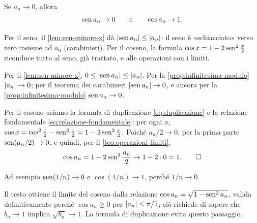 \begin{teorema}\label{teo:lim-sen-cos}
Se $a_{n}\to0$, allora
\begin{equation}\label{eq:lim-sen-cos}
  \operatorname{sen} a_{n}\to0 \qquad\text{e}\qquad \cos a_{n}\to1 .
\end{equation}
\end{teorema}

\begin{schema}
\end{schema}

\begin{strategia}
Per il seno, il \cref{lem:sen-minore-x} dà $\lvert \operatorname{sen} a_{n}\rvert\le\lvert a_{n}\rvert$: il seno è
«schiacciato» verso zero insieme ad $a_{n}$ (carabinieri). Per il coseno, la formula
$\cos x=1-2\operatorname{sen}^{2}\frac x2$ riconduce tutto al seno, già trattato, e alle operazioni con
i limiti.
\end{strategia}

\begin{dimostrazione}
Per il \cref{lem:sen-minore-x}, $0\le\lvert \operatorname{sen} a_{n}\rvert\le\lvert a_{n}\rvert$. Per la
\cref{prop:infinitesima-modulo} $\lvert a_{n}\rvert\to0$; per il teorema dei carabinieri
$\lvert \operatorname{sen} a_{n}\rvert\to0$, e ancora per la \cref{prop:infinitesima-modulo} $\operatorname{sen} a_{n}\to0$.

Per il coseno usiamo la formula di duplicazione \eqref{eq:duplicazione} e la relazione
fondamentale \eqref{eq:relazione-fondamentale}: per ogni $x$,
$\cos x=\cos^{2}\frac x2-\operatorname{sen}^{2}\frac x2=1-2\operatorname{sen}^{2}\frac x2$. Poiché $a_{n}/2\to0$, per
la prima parte $\operatorname{sen}(a_{n}/2)\to0$, e quindi, per il \cref{teo:operazioni-limiti},
\begin{equation}\label{eq:cos-passo}
  \cos a_{n}=1-2\operatorname{sen}^{2}\frac{a_{n}}{2}\to1-2\cdot0=1. \qedhere
\end{equation}
\end{dimostrazione}

Ad esempio $\operatorname{sen}(1/n)\to0$ e $\cos(1/n)\to1$, perché $1/n\to0$.

\begin{osservazione}
Il testo \cite{marcellini-sbordone} ottiene il limite del coseno dalla relazione
$\cos a_{n}=\sqrt{1-\operatorname{sen}^{2}a_{n}}$, valida definitivamente perché $\cos a_{n}\ge0$ per
$\lvert a_{n}\rvert\le\pi/2$; ciò richiede di sapere che $b_{n}\to1$ implica $\sqrt{b_{n}}\to1$.
La formula di duplicazione evita questo passaggio.
\end{osservazione}

